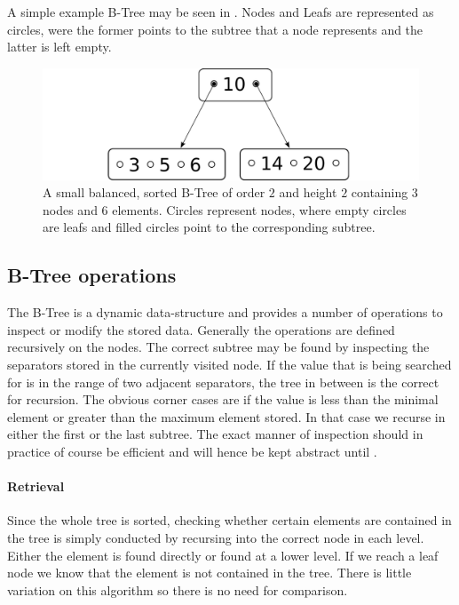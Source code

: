 A simple example B-Tree may be seen in .
Nodes and Leafs are represented as circles, were the former points to the
subtree that a node represents and the latter is left empty.

\begin{figure}
    \centering
    \includegraphics[width=0.5\linewidth]{figures/btree-basic-nopair.pdf}
    \caption{A small balanced, sorted B-Tree of order $2$ and
    height $2$ containing $3$ nodes and $6$ elements.
    Circles represent nodes, where empty circles are leafs and filled circles
    point to the corresponding subtree.}
    \label{fig:btree-basic-nopair}
\end{figure}

\subsection{B-Tree operations}

The B-Tree is a dynamic data-structure and provides
a number of operations to inspect or modify the stored data.
Generally the operations are defined recursively on the nodes.
The correct subtree may be found by inspecting the separators stored
in the currently visited node.
If the value that is being searched for is in the range of two
adjacent separators, the tree in between is the correct for recursion. 
The obvious corner cases are if the value is less than the
minimal element or greater than the maximum element stored.
In that case we recurse in either the first or the last subtree.
The exact manner of inspection should in practice of course
be efficient and will hence be kept abstract until .

\paragraph{Retrieval}\label{par:intro-isin}
Since the whole tree is sorted,
checking whether certain elements are contained in the tree
is simply conducted by recursing into the correct node
in each level.
Either the element is found directly or found at a lower level.
If we reach a leaf node we know that the element is not contained in the tree.
There is little variation on this algorithm so there is no need for comparison.

